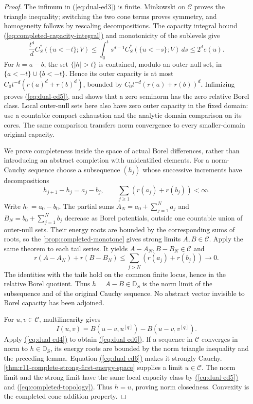 \documentclass[11pt,reqno]{amsart}
\theoremstyle{definition}
\theoremstyle{remark}
\numberwithin{equation}{section}
\newcommand{\MathEqref}[1]{\begingroup\hypersetup{linkcolor=EquationLink}\hyperref[#1]{(\ref*{#1})}\endgroup}
\begin{document}
\begin{proof}
The infimum in \MathEqref{eq:dual-ed3} is finite. Minkowski on $\mathscr C$ proves
the triangle inequality; switching the two cone terms proves
symmetry, and homogeneity follows by rescaling decompositions.
The capacity integral bound \MathEqref{eq:completed-capacity-integral} and
monotonicity of the sublevels give
\[
 \frac{t^d}{d}C_S^*(\{u<-t\};V)
       \leq\int_0^t s^{d-1}C_S^*(\{u<-s\};V)\,ds
       \leq2^d e(u).
\]
For $h=a-b$, the set $\{|h|>t\}$ is contained, modulo an
outer-null set, in $\{a<-t\}\cup\{b<-t\}$. Hence its outer
capacity is at most $C_0t^{-d}(r(a)^d+r(b)^d)$, bounded by
$C_0t^{-d}(r(a)+r(b))^d$. Infimizing proves \MathEqref{eq:dual-ed5}, and shows
that a zero seminorm has the zero relative Borel class. Local
outer-null sets here also have zero outer capacity in the fixed
domain: use a countable compact exhaustion and the analytic domain comparison on its cores. The same comparison transfers norm
convergence to every smaller-domain original capacity.

We prove completeness inside the space of actual Borel differences,
rather than introducing an abstract completion with unidentified
elements. For a norm-Cauchy sequence choose a subsequence $(h_j)$
whose successive increments have decompositions
\begin{equation}\label{eq:dual-ed7}
 h_{j+1}-h_j=a_j-b_j,\qquad
 \sum_{j\geq1}(r(a_j)+r(b_j))<\infty.
\end{equation}
Write $h_1=a_0-b_0$. The partial sums
$A_N=a_0+\sum_{j=1}^N a_j$ and
$B_N=b_0+\sum_{j=1}^N b_j$ decrease as Borel potentials,
outside one countable union of outer-null sets. Their energy
roots are bounded by the corresponding sums of roots, so the
\cref{prop:completed-monotone} gives strong limits
$A,B\in\mathscr C$. Apply the same theorem to each tail series.
It yields $A-A_N,B-B_N\in\mathscr C$ and
\begin{equation}\label{eq:dual-ed8}
 r(A-A_N)+r(B-B_N)
          \leq\sum_{j>N}(r(a_j)+r(b_j))\longrightarrow0.
\end{equation}
The identities with the tails hold on the common finite locus,
hence in the relative Borel quotient. Thus $h=A-B\in\mathbb D_S$
is the norm limit of the subsequence and of the original Cauchy
sequence. No abstract vector invisible to Borel capacity has been
adjoined.

For $u,v\in\mathscr C$, multilinearity gives
\[
 I(u,v)=B(u-v,u^{[q]})-B(u-v,v^{[q]}).
\]
Apply \MathEqref{eq:dual-ed4} to obtain \MathEqref{eq:dual-ed6}. If a sequence in $\mathscr C$
converges in norm to $h\in\mathbb D_S$, its energy roots are
bounded by the norm triangle inequality and the preceding lemma.
Equation \MathEqref{eq:dual-ed6} makes it strongly Cauchy. \cref{thm:r11-complete-strong-first-energy-space} supplies
a limit $u\in\mathscr C$. The norm limit and the strong limit
have the same local capacity class by \MathEqref{eq:dual-ed5} and \MathEqref{eq:completed-topology}. Thus $h=u$, proving norm closedness.
Convexity is the completed cone addition property.
\end{proof}
\end{document}
